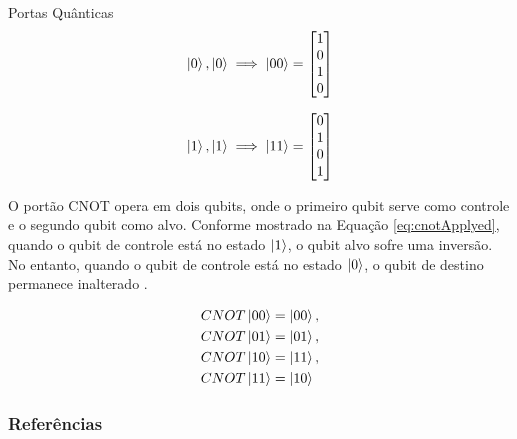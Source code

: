 \begin{frame}[allowframebreaks]{Portas Quânticas}
		\begin{equation}
			\label{eq:ketForTwoVectors01}
			\ket{0}, \ket{0} \implies
			\ket{00} = \begin{bmatrix}
				1 \\
				0 \\
				1 \\
				0
			\end{bmatrix}				
		\end{equation}
		
		\begin{equation}
			\label{eq:ketForTwoVectors02}
			\ket{1}, \ket{1} \implies
			\ket{11} = \begin{bmatrix}
				0 \\
				1 \\
				0 \\
				1
			\end{bmatrix}				
		\end{equation}
		
		\par O portão CNOT opera em dois qubits, onde o primeiro qubit serve como controle e o segundo qubit como alvo. Conforme mostrado na Equação \ref{eq:cnotApplyed}, quando o qubit de controle está no estado $\ket{1}$, o qubit alvo sofre uma inversão. No entanto, quando o qubit de controle está no estado $\ket{0}$, o qubit de destino permanece inalterado \cite{nielsen2002quantum}.
		
		\begin{equation}
			\label{eq:cnotApplyed}
			\begin{aligned}
				&CNOT\ket{00} = \ket{00}, \\
				&CNOT\ket{01} = \ket{01}, \\
				&CNOT\ket{10} = \ket{11}, \\
				&CNOT\ket{11} = \ket{10}
			\end{aligned}
		\end{equation}
	\end{frame}
	
	\begin{frame}[allowframebreaks]
		\frametitle{Referências}
		
	\end{frame}
	
